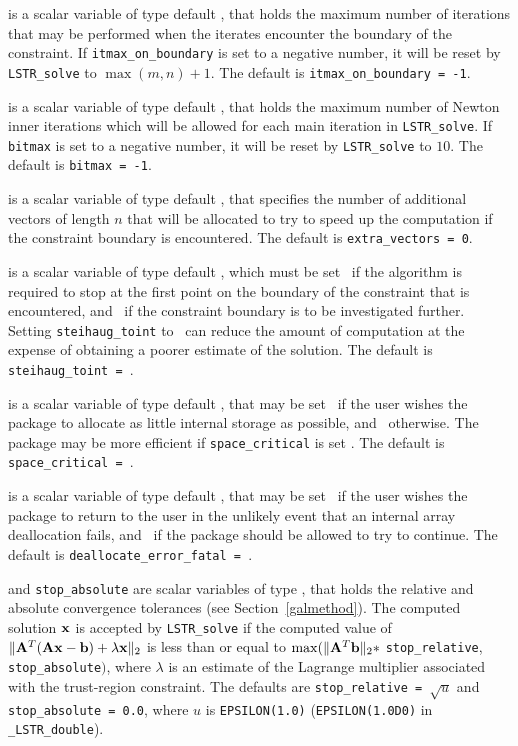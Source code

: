 \documentclass{galahad}
\newcommand{\packagename}{LS\-TR}
\newcommand{\fullpackagename}{\libraryname\_\packagename}
\begin{document}
\begin{description}
 is a scalar variable of type default \integer, 
that holds the 
maximum number of iterations that may be performed when the iterates 
encounter the boundary of the constraint. 
If {\tt itmax\_on\_boundary} is set to a negative number, it will be reset by  
{\tt \packagename\_solve} to $\max(m,n)+1$. 
The default is {\tt itmax\_on\_boundary = -1}.

 is a scalar variable of type default \integer, that holds the 
maximum number of Newton inner iterations which will be allowed for each
main iteration in {\tt \packagename\_solve}. 
If {\tt bitmax} is set to a negative number, it will be reset by  
{\tt \packagename\_solve} to $10$. 
The default is {\tt bitmax = -1}.
 
 is a scalar variable of type default \integer, 
that specifies the number of additional vectors of length $n$
that will be allocated to try to speed up the computation if the 
constraint boundary  is encountered.
The default is {\tt extra\_vectors = 0}.
 
 is a scalar variable of type default \logical,
which must be set \true\ if the algorithm is required to stop at
the first point on the boundary of the constraint that is encountered,
and \false\  if the constraint boundary is to be investigated
further.  Setting {\tt steihaug\_toint} to \true\ can reduce the
amount of computation at the expense of obtaining a poorer estimate of
the solution.
The default is {\tt steihaug\_toint = \true}.
 
 is a scalar variable of type default \logical, that
may be set \true\ if the user wishes the package to allocate as little
internal storage as possible, and \false\ otherwise. The package may
be more efficient if {\tt space\_critical} is set \false.
The default is {\tt space\_critical = \false}.

 is a scalar variable of type default \logical, 
that may be set \true\ if the user wishes the package to return to the user 
in the unlikely event that an internal array deallocation fails, 
and \false\ if the package should be allowed to try to continue.
The default is {\tt deallocate\_error\_fatal = \false}.

 and {\tt stop\_absolute} are scalar variables of type 
\realdp, that holds the 
relative and absolute convergence tolerances (see Section~\ref{galmethod}).  
The computed solution ${\mathbf{x}}$ is accepted by {\tt \packagename\_solve} 
if the computed value of  
$\|{\mathbf{A}}^T ( {\mathbf{A}} {\mathbf{x}} - {\mathbf{b}} ) + \lambda {\mathbf{x}}\|_2$
is less than or equal 
to $\max (\| {\mathbf{A}}^T {\mathbf{b}} \|_2 \ast$ {\tt stop\_relative}, 
{\tt stop\_absolute}$)$, where $\lambda$ is an estimate of the Lagrange 
multiplier associated with the trust-region constraint. 
The defaults are {\tt stop\_relative = $\sqrt{u}$} and
{\tt stop\_absolute = 0.0}, 
where $u$ is {\tt EPSILON(1.0)} ({\tt EPSILON(1.0D0)} in 
{\tt \fullpackagename\_double}).


\end{description}
\end{document}
